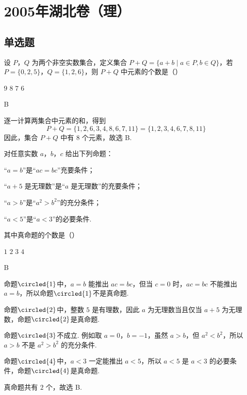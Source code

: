 \chapter{2005年湖北卷（理）}
\section{单选题}
\begin{problem}
设 \(P\)，\(Q\) 为两个非空实数集合，定义集合 \(P + Q = \{a + b \mid a \in P, b \in Q\}\)，若 \(P = \{0, 2, 5\}\)，\(Q = \{1, 2, 6\}\)，则 \(P + Q\) 中元素的个数是（\quad）

\choices
    {\(9\)}
    {\(8\)}
    {\(7\)}
    {\(6\)}
\end{problem}

\begin{answer}
B
\end{answer}

\begin{solution}
逐一计算两集合中元素的和，得到
\[
P+Q=\{1,2,6,3,4,8,6,7,11\}=\{1,2,3,4,6,7,8,11\}
\]
因此，集合 \(P+Q\) 中有 \(8\) 个元素，故选 B.
\end{solution}

\begin{problem}
对任意实数 \(a\)，\(b\)，\(c\) 给出下列命题：

\begin{circlelist}
\item “\(a = b\)”是“\(ac = bc\)”充要条件；
\item “\(a + 5\) 是无理数”是“\(a\) 是无理数”的充要条件；
\item “\(a > b\)”是“\(a^{2} > b^{2}\)”的充分条件；
\item “\(a < 5\)”是“\(a < 3\)”的必要条件.
\end{circlelist}

其中真命题的个数是（\quad）

\choices
    {\(1\)}
    {\(2\)}
    {\(3\)}
    {\(4\)}
\end{problem}

\begin{answer}
B
\end{answer}

\begin{solution}
命题\(\circled{1}\)中，\(a=b\) 能推出 \(ac=bc\)，但当 \(c=0\) 时，\(ac=bc\) 不能推出 \(a=b\)，所以命题\(\circled{1}\)不是真命题.

命题\(\circled{2}\)中，整数 \(5\) 是有理数，因此 \(a\) 为无理数当且仅当 \(a+5\) 为无理数，命题\(\circled{2}\)是真命题.

命题\(\circled{3}\)不成立. 例如取 \(a=0\)，\(b=-1\)，虽然 \(a>b\)，但 \(a^2<b^2\)，所以 \(a>b\) 不是 \(a^2>b^2\) 的充分条件.

命题\(\circled{4}\)中，\(a<3\) 一定能推出 \(a<5\)，所以 \(a<5\) 是 \(a<3\) 的必要条件，命题\(\circled{4}\)是真命题.

真命题共有 \(2\) 个，故选 B.
\end{solution}

